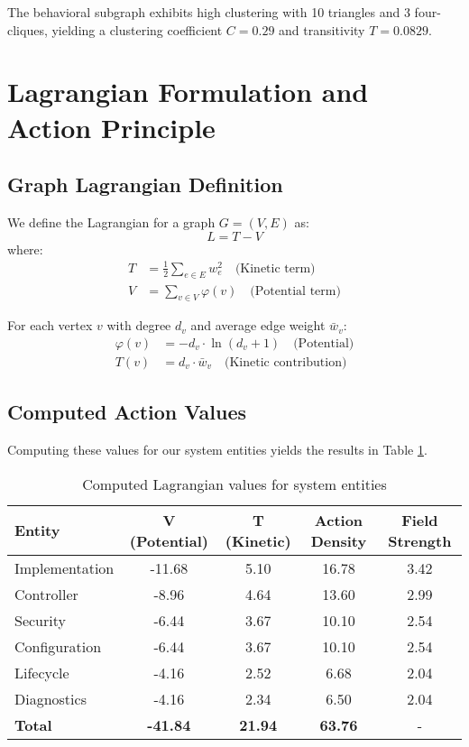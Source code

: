 \documentclass[12pt,a4paper]{article}
\begin{document}
The behavioral subgraph exhibits high clustering with 10 triangles and 3 four-cliques, yielding a clustering coefficient $C = 0.29$ and transitivity $T = 0.0829$.

\section{Lagrangian Formulation and Action Principle}

\subsection{Graph Lagrangian Definition}

We define the Lagrangian for a graph $G = (V, E)$ as:
\begin{equation}
L = T - V
\end{equation}
where:
\begin{align}
T &= \frac{1}{2} \sum_{e \in E} w_e^2 \quad \text{(Kinetic term)} \\
V &= \sum_{v \in V} \varphi(v) \quad \text{(Potential term)}
\end{align}

For each vertex $v$ with degree $d_v$ and average edge weight $\bar{w}_v$:
\begin{align}
\varphi(v) &= -d_v \cdot \ln(d_v + 1) \quad \text{(Potential)} \\
T(v) &= d_v \cdot \bar{w}_v \quad \text{(Kinetic contribution)}
\end{align}

\subsection{Computed Action Values}

Computing these values for our system entities yields the results in Table \ref{tab:action}.

\begin{table}[h]
\centering
\caption{Computed Lagrangian values for system entities}
\label{tab:action}
\begin{tabular}{lcccc}
\toprule
\textbf{Entity} & \textbf{V (Potential)} & \textbf{T (Kinetic)} & \textbf{Action Density} & \textbf{Field Strength} \\
\midrule
Implementation & -11.68 & 5.10 & 16.78 & 3.42 \\
Controller & -8.96 & 4.64 & 13.60 & 2.99 \\
Security & -6.44 & 3.67 & 10.10 & 2.54 \\
Configuration & -6.44 & 3.67 & 10.10 & 2.54 \\
Lifecycle & -4.16 & 2.52 & 6.68 & 2.04 \\
Diagnostics & -4.16 & 2.34 & 6.50 & 2.04 \\
\midrule
\textbf{Total} & \textbf{-41.84} & \textbf{21.94} & \textbf{63.76} & - \\
\bottomrule
\end{tabular}
\end{table}
\end{document}
